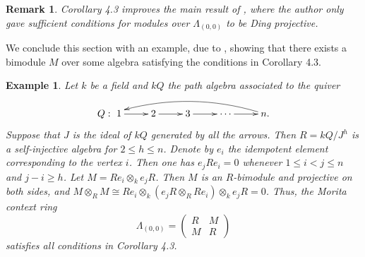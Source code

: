 \documentclass[10pt,twoside]{amsart}
\theoremstyle{bfupright head,slanted body}
\theoremstyle{bfupright head,upright body}
\theoremstyle{fixed bf head,slanted body}
\theoremstyle{fixed bf head,upright body}
\newtheorem{rmk}[res]{Remark}           \newtheorem*{rmk*}{Remark}
\newtheorem{exa}[res]{Example}           \newtheorem*{exa*}{Example}
\theoremstyle{numbered paragraph}
\numberwithin{equation}{res}
\begin{document}
\begin{rmk}
Corollary 4.3 improves the main result of \cite[Theorem 2.10]{A}, where the author only gave sufficient conditions for modules over $\Lambda_{(0,0)}$ to be Ding projective. 
\end{rmk}

We conclude this section with an example, due to \cite[Example 4.6]{DL}, showing that
there exists a bimodule $M$ over some algebra satisfying
the conditions in Corollary 4.3.

\begin{exa}\label{exa of motita UV=0}
Let $k$ be a field and $kQ$ the path algebra
associated to the quiver
\begin{align*}
\xymatrix{
Q:\  1 \ar[r]_{} & 2 \ar[r]_{} & 3 \ar[r]_{}
  & \cdots \ar[r]_{} & n \ar@/_3ex/[llll]_{}.}
\end{align*}
Suppose that $J$ is the ideal of $kQ$ generated by all the arrows.
Then $R=kQ/J^h$ is a self-injective algebra for $2\leqslant h \leqslant n$.
Denote by $e_i$ the idempotent element corresponding to the vertex $i$.
Then one has $e_jRe_i = 0$ whenever
$1\leqslant i< j\leqslant n$ and $j-i \geqslant h$.
Let $M = Re_i\otimes_k e_jR$. Then $M$ is an $R$-bimodule and projective on both sides, and $M\otimes_RM\cong Re_i\otimes_k (e_jR\otimes_RRe_i)\otimes_k e_jR=0$.
Thus, the Morita context ring
$$\Lambda_{(0,0)}=\begin{pmatrix}R & M \\ M & R\end{pmatrix}$$
satisfies all conditions in Corollary 4.3.
\end{exa}




\end{document}

